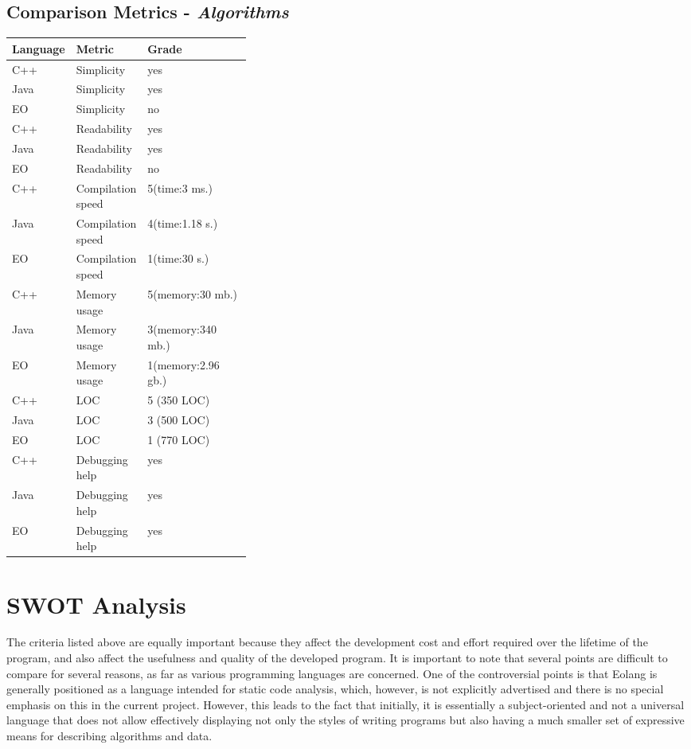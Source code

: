\documentclass[12pt]{book}
\begin{document}
\subsection{Comparison Metrics - \emph{Algorithms}}
\label{table:metrics}
\begin{center}
    \begin{tabular}{|p{0.1\linewidth}|p{0.25\linewidth}|l|}
\hline
Language&Metric&Grade \\ \hline
C++ &Simplicity &yes \\
Java &Simplicity &yes \\
EO &Simplicity &no \\ \hline
C++ &Readability &yes\\
Java &Readability &yes\\
EO &Readability &no\\\hline
C++ &Compilation speed&5(time:3 ms.)\\
Java &Compilation speed&4(time:1.18 s.)\\
EO &Compilation speed&1(time:30 s.)\\\hline
C++ &Memory usage&5(memory:30 mb.)\\
Java &Memory usage&3(memory:340 mb.)\\
EO &Memory usage&1(memory:2.96 gb.)\\\hline
C++ &LOC&5 (350 LOC)\\
Java &LOC&3 (500 LOC)\\
EO &LOC&1 (770 LOC)\\\hline
C++ &Debugging help&yes\\
Java &Debugging help&yes\\
EO &Debugging help&yes\\\hline
\end{tabular}
\end{center}


\section{SWOT Analysis}

The criteria listed above are equally important because they affect the development cost and effort required over the lifetime of the program, and also affect the usefulness and quality of the developed program.
It is important to note that several points are difficult to compare for several reasons, as far as various programming languages are concerned. One of the controversial points is that Eolang is generally positioned as a language intended for static code analysis, which, however, is not explicitly advertised and there is no special emphasis on this in the current project. However, this leads to the fact that initially, it is essentially a subject-oriented and not a universal language that does not allow effectively displaying not only the styles of writing programs but also having a much smaller set of expressive means for describing algorithms and data.
\end{document}

